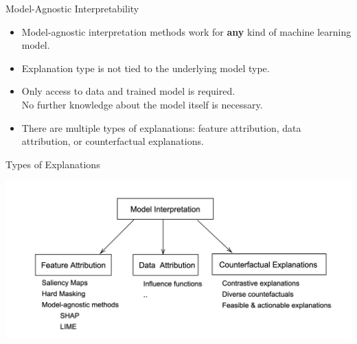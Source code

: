 \documentclass[11pt,compress,t,notes=noshow, aspectratio=169, xcolor=table]{beamer}
\begin{document}
\begin{vbframe}{Model-Agnostic Interpretability}
	\begin{itemize}
		\itemsep2em
		\item Model-agnostic interpretation methods work for \textbf{any} kind of machine learning model.
		\item Explanation type is not tied to the underlying model type.
		\item Only access to data and trained model is required.\\
		 No further knowledge about the model itself is necessary.
		\item There are multiple types of explanations: feature attribution, data attribution, or counterfactual explanations.
	\end{itemize}
\end{vbframe}


\begin{vbframe}{Types of Explanations}
	\begin{center}
		\includegraphics[width=\textwidth]{figure/1-attributions.png}
    \end{center}
\end{vbframe}
\end{document}
